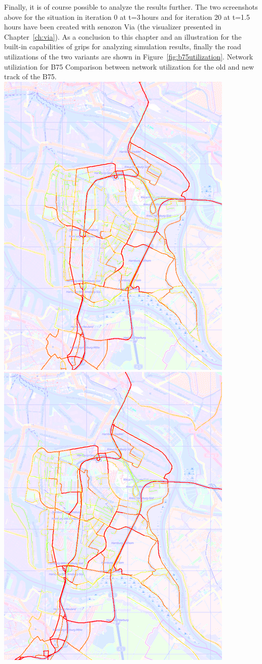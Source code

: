 Finally, it is of course possible to analyze the results further. The two screenshots above for the situation in iteration 0 at t=3\,hours and for iteration 20 at t=1.5\,hours have been created with \gls{senozon} Via (the visualizer presented in Chapter~\ref{ch:via}). As a conclusion to this chapter and an illustration for the built-in capabilities of \gls{grips} for analyzing simulation results, finally the road utilizations of the two variants are shown in Figure~\ref{fig:b75utilization}.
%
\createfigure%
{Network utiliziation for B75}%
{Comparison between network utilization for the old and new track of the B75.}%
{\label{fig:b75utilization}}%
{%
  \createsubfigure%
  {}%
  {\includegraphics[width=.475\linewidth]{using/figures/b75utilizationold}}%
  {}%
  {}%
  \createsubfigure%
  {}%
  {\includegraphics[width=.475\linewidth]{using/figures/b75utilizationnew}}
  {}%
  {}%
}%
  {}%
